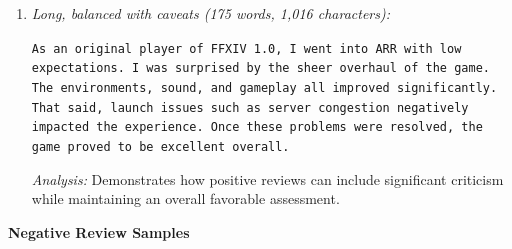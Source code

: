 \begin{enumerate}
    \textit{Analysis:} Provides a comprehensive evaluation with comparisons to earlier titles, addressing pacing, mechanics, and narrative depth.

    \item \textit{Long, balanced with caveats (175 words, 1{,}016 characters):}

    \texttt{As an original player of FFXIV 1.0, I went into ARR with low expectations. I was surprised by the sheer overhaul of the game. The environments, sound, and gameplay all improved significantly. That said, launch issues such as server congestion negatively impacted the experience. Once these problems were resolved, the game proved to be excellent overall.}

    \textit{Analysis:} Demonstrates how positive reviews can include significant criticism while maintaining an overall favorable assessment.
\end{enumerate}

\textbf{Negative Review Samples}

